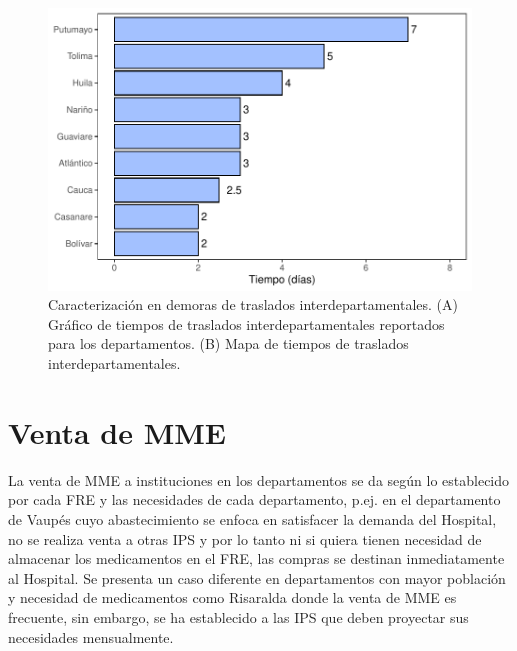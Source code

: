 \documentclass[
  oneside]{book}
\begin{document}
\begin{figure}[t]

{\centering \includegraphics[width=1\linewidth]{InformeFinal_files/figure-latex/TiemposTranslados-1} 

}

\caption{Caracterización en demoras de traslados interdepartamentales. (A) Gráfico de tiempos de traslados interdepartamentales reportados para los departamentos. (B) Mapa de tiempos de traslados interdepartamentales.}\label{fig:TiemposTranslados}
\end{figure}

\hypertarget{venta-de-mme}{%
\section{Venta de MME}\label{venta-de-mme}}


La venta de MME a instituciones en los departamentos se da según lo establecido por cada FRE y las necesidades de cada departamento, p.ej. en el departamento de Vaupés cuyo abastecimiento se enfoca en satisfacer la demanda del Hospital, no se realiza venta a otras IPS y por lo tanto ni si quiera tienen necesidad de almacenar los medicamentos en el FRE, las compras se destinan inmediatamente al Hospital. Se presenta un caso diferente en departamentos con mayor población y necesidad de medicamentos como Risaralda donde la venta de MME es frecuente, sin embargo, se ha establecido a las IPS que deben proyectar sus necesidades mensualmente.
\end{document}
